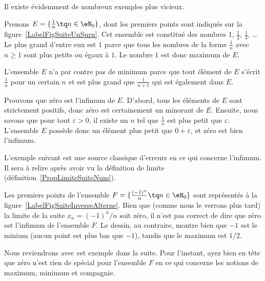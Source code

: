 Il existe évidemment de nombreux exemples plus vicieux.

\begin{example}
	Prenons \( E=\{ \frac{1}{ n }\tq n\in\eN_0 \}\), dont les premiers points sont indiqués sur la figure~\ref{LabelFigSuiteUnSurn}. Cet ensemble est constitué des nombres \( 1\), \( \frac{ 1 }{2}\), \( \frac{1}{ 3 }\), \ldots Le plus grand d'entre eux est \( 1\) parce que tous les nombres de la forme \( \frac{1}{ n }\) avec \( n\geq 1\) sont plus petits ou égaux à \( 1\). Le nombre \( 1\) est donc maximum de \( E\).

	L'ensemble \( E\) n'a par contre pas de minimum parce que tout élément de \( E\) s'écrit \( \frac{1}{ n }\) pour un certain \( n\) et est plus grand que \( \frac{1}{ n+1 }\) qui est également dans \( E\).

	Prouvons que zéro est l'infimum de \( E\). D'abord, tous les éléments de \( E\) sont strictement positifs, donc zéro est certainement un minorant de \( E\). Ensuite, nous savons que pour tout \( \varepsilon>0\), il existe un \( n\) tel que \( \frac{1}{ n }\) est plus petit que \( \varepsilon\). L'ensemble \( E\) possède donc un élément plus petit que \( 0+\varepsilon\), et zéro est bien l'infimum.
\end{example}

\newcommand{\CaptionFigSuiteUnSurn}{Les premiers points du type \( x_n=1/n\).}


L'exemple suivant est une source classique d'erreurs en ce qui concerne l'infimum. Il sera à relire après avoir vu la définition de limite (définition~\ref{PropLimiteSuiteNum}).

\begin{example}
	Les premiers points de l'ensemble \( F=\{ \frac{ (-1)^n }{ n }\tq n\in\eN_0 \}\) sont représentés à la figure~\ref{LabelFigSuiteInverseAlterne}. Bien que (comme nous le verrons plus tard) la limite de la suite \( x_n=(-1)^n/n\) soit zéro, il n'est pas correct de dire que zéro est l'infimum de l'ensemble \( F\). Le dessin, au contraire, montre bien que \( -1\) est le minium (aucun point est plus bas que \( -1\)), tandis que le maximum est \( 1/2\).

	Nous reviendrons avec cet exemple dans la suite. Pour l'instant, ayez bien en tête que zéro n'est rien de spécial pour l'ensemble \( F\) en ce qui concerne les notions de maximum, minimum et compagnie.
\end{example}
\newcommand{\CaptionFigSuiteInverseAlterne}{Les quelques premiers points du type \( (-1)^n/n\).}


